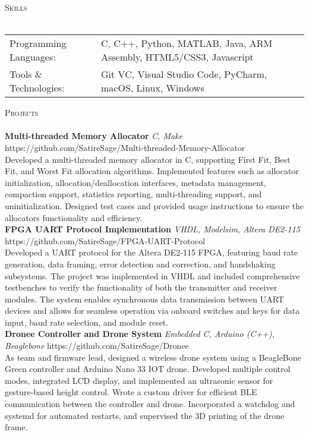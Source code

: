 \documentclass[a4paper]{article}
\newcommand{\lineunder} {
    \vspace*{-8pt} \\
    \hspace*{-18pt} \hrulefill \\
}
\newcommand{\header} [1] {
    {\hspace*{-18pt}\vspace*{6pt} \textsc{#1}}
    \vspace*{-6pt} \lineunder
}
\begin{document}
\header{Skills}
\begin{tabular}{ l l }
	Programming Languages: & C, C++, Python, MATLAB, Java, ARM Assembly, HTML5/CSS3, Javascript \\
	Tools \& Technologies: & Git VC, Visual Studio Code, PyCharm, macOS, Linux, Windows         \\
\end{tabular}
\vspace{2mm}

\header{Projects}
{\textbf{Multi-threaded Memory Allocator}} {\sl C, Make} \hfill https://github.com/SatireSage/Multi-threaded-Memory-Allocator\\
Developed a multi-threaded memory allocator in C, supporting First Fit, Best Fit, and Worst Fit allocation algorithms. Implemented features such as allocator initialization, allocation/deallocation interfaces, metadata management, compaction support, statistics reporting, multi-threading support, and uninitialization. Designed test cases and provided usage instructions to ensure the allocator\textquotesingle{}s functionality and efficiency.\\
\vspace*{2mm}
{\textbf{FPGA UART Protocol Implementation}} {\sl VHDL, Modelsim, Altera DE2-115} \hfill https://github.com/SatireSage/FPGA-UART-Protocol\\
Developed a UART protocol for the Altera DE2-115 FPGA, featuring baud rate generation, data framing, error detection and correction, and handshaking subsystems. The project was implemented in VHDL and included comprehensive testbenches to verify the functionality of both the transmitter and receiver modules. The system enables synchronous data transmission between UART devices and allows for seamless operation via onboard switches and keys for data input, baud rate selection, and module reset.\\
\vspace*{2mm}
{\textbf{Dronee Controller and Drone System}} {\sl Embedded C, Arduino (C++), Beaglebone} \hfill https://github.com/SatireSage/Dronee\\
As team and firmware lead, designed a wireless drone system using a BeagleBone Green controller and Arduino Nano 33 IOT drone. Developed multiple control modes, integrated LCD display, and implemented an ultrasonic sensor for gesture-based height control. Wrote a custom driver for efficient BLE communication between the controller and drone. Incorporated a watchdog and systemd for automated restarts, and supervised the 3D printing of the drone frame.\\
\end{document}
